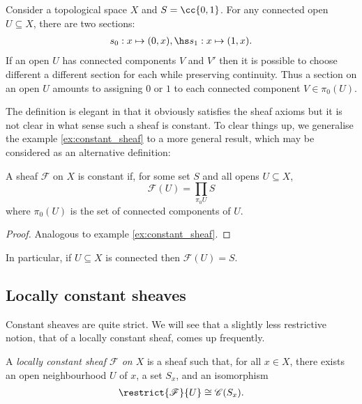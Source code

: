\documentclass{article}
\begin{document}
\begin{example}\label{ex:constant_sheaf}
  Consider a topological space $X$ and $S=\cc{0,1}$. For any
  connected open $U\subseteq X$, there are two sections:
  \begin{align*}
    s_0:x \mapsto(0,x), \hs s_1:x\mapsto(1,x).
  \end{align*}
  If an open $U$ has connected components $V$ and $V'$ then
  it is possible to choose different a different section for each
  while preserving continuity. Thus a section on an open $U$ amounts
  to assigning $0$ or $1$ to each connected component $V\in\pi_0(U)$.
\end{example}

The definition is elegant in that it obviously satisfies the sheaf
axioms but it is not clear in what sense such a sheaf is constant.
To clear things up, we generalise the example \ref{ex:constant_sheaf}
to a more general result, which may be considered as an alternative
definition:

\begin{proposition}
  A sheaf $\mathscr F$ on $X$ is constant if, for some set $S$ and all opens $U\subseteq X$,
  \begin{equation}
    \mathscr F(U) = \prod_{\pi_0U}S
  \end{equation}
  where $\pi_0(U)$ is the set of connected components of $U$.
  \begin{proof}
    Analogous to example \ref{ex:constant_sheaf}.
  \end{proof}
\end{proposition}

In particular, if $U\subseteq X$ is connected then $\mathscr F(U)=S$.

\subsection{Locally constant sheaves}

Constant sheaves are quite strict. We will see that a slightly less
restrictive notion, that of a locally constant sheaf, comes up
frequently.

\begin{definition}
  A \emph{locally constant sheaf $\mathscr F$ on $X$} is a sheaf such that,
  for all $x\in X$, there exists an open neighbourhood $U$ of $x$,
  a set $S_x$, and an isomorphism
  \begin{align*}
    \restrict{\mathscr F}{U} \cong \mathscr C(S_x).
  \end{align*}
\end{definition}
\end{document}
